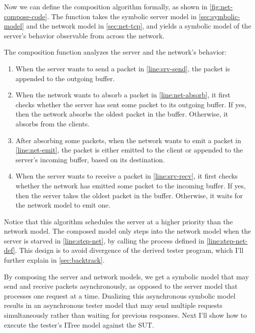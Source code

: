 Now we can define the composition algorithm formally, as shown in
\autoref{fig:net-compose-code}.  The function takes the symbolic server model
in \autoref{sec:symbolic-model} and the network model in \autoref{sec:net-tcp},
and yields a symbolic model of the server's behavior observable from across the
network.

The composition function analyzes the server and the network's behavior:
\begin{enumerate}
\item When the server wants to send a packet in \autoref{line:srv-send}, the
packet is appended to the outgoing buffer.
\item When the network wants to absorb a packet in \autoref{line:net-absorb},
it first checks whether the server has sent some packet to its outgoing buffer.
If yes, then the network absorbs the oldest packet in the buffer.  Otherwise, it
absorbs from the clients.
\item After absorbing some packets, when the network wants to emit a packet in
\autoref{line:net-emit}, the packet is either emitted to the client or appended
to the server's incoming buffer, based on its destination.
\item When the server wants to receive a packet in \autoref{line:srv-recv},
it first checks whether the network has emitted some packet to the incoming
buffer.  If yes, then the server takes the oldest packet in the buffer.
Otherwise, it waits for the network model to emit one.
\end{enumerate}

Notice that this algorithm schedules the server at a higher priority than the
network model.  The composed model only steps into the network model when the
server is starved in \autoref{line:step-net}, by calling the 
process defined in \autoref{line:step-net-def}.  This design is to avoid
divergence of the derived tester program, which I'll further explain in
\autoref{sec:backtrack}.

By composing the server and network models, we get a symbolic model that may
send and receive packets asynchronously, as opposed to the server model that
processes one request at a time.  Dualizing this asynchronous symbolic model
results in an asynchronous tester model that may send multiple requests
simultaneously rather than waiting for previous responses.  Next I'll show how
to execute the tester's ITree model against the SUT.
